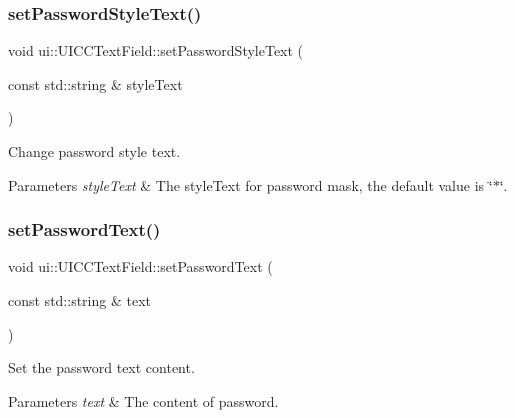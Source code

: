 \subsubsection{\texorpdfstring{set\+Password\+Style\+Text()}{setPasswordStyleText()}\hspace{0.1cm}{\footnotesize\ttfamily [2/2]}}
{\footnotesize\ttfamily void ui\+::\+U\+I\+C\+C\+Text\+Field\+::set\+Password\+Style\+Text (\begin{DoxyParamCaption}\item[{const std\+::string \&}]{style\+Text }\end{DoxyParamCaption})}



Change password style text. 


\begin{DoxyParams}{Parameters}
{\em style\+Text} & The style\+Text for password mask, the default value is \char`\"{}$\ast$\char`\"{}. \\
\hline
\end{DoxyParams}
\mbox{\label{classui_1_1UICCTextField_a5dd72d55d3859c50ca346d0a76b66bfa}} 
\subsubsection{\texorpdfstring{set\+Password\+Text()}{setPasswordText()}\hspace{0.1cm}{\footnotesize\ttfamily [1/2]}}
{\footnotesize\ttfamily void ui\+::\+U\+I\+C\+C\+Text\+Field\+::set\+Password\+Text (\begin{DoxyParamCaption}\item[{const std\+::string \&}]{text }\end{DoxyParamCaption})}



Set the password text content. 


\begin{DoxyParams}{Parameters}
{\em text} & The content of password. \\
\hline
\end{DoxyParams}
\mbox{\label{classui_1_1UICCTextField_a5dd72d55d3859c50ca346d0a76b66bfa}} 
